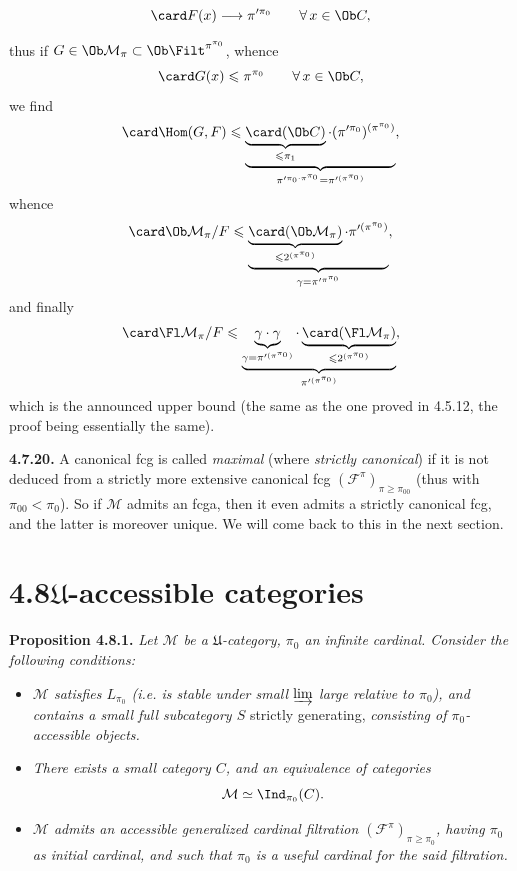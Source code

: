 

\[ \card F(x) \longrightarrow \pi'^{\pi_0} \qquad \forall\, x \in \Ob C , \] %

thus if $G \in \Ob \mathcal{M}_\pi \subset \Ob \Filt^{\pi^{\pi_0}}$, whence
\[ \card G(x) \leqslant \pi^{\pi_0} \qquad \forall\, x \in \Ob C , \]
we find
\[ \card \Hom(G,F) \leqslant \underbrace{\underbrace{\card(\Ob C)}_{\leqslant \pi_1}\cdot(\pi'^{\pi_0})^{(\pi^{\pi_0})}}_{\pi'^{\pi_0\cdot\pi^{\pi_0}} = \pi'^{(\pi^{\pi_0})}} , \]
whence
\[ \card \Ob \mathcal{M}_\pi/F \leqslant \underbrace{\underbrace{\card(\Ob \mathcal{M}_\pi)}_{\leqslant 2^{(\pi^{\pi_0})}}\cdot\pi'^{(\pi^{\pi_0})}}_{\gamma = \pi'^{\pi^{\pi_0}}} , \]
and finally
\[ \card \Fl \mathcal{M}_\pi/F \leqslant \underbrace{\underbrace{\gamma\cdot\gamma}_{\gamma = \pi'^{(\pi^{\pi_0})}}\cdot\underbrace{\card(\Fl \mathcal{M}_\pi)}_{\leqslant 2^{(\pi^{\pi_0})}}}_{\pi'^{(\pi^{\pi_0})}} , \]
which is the announced upper bound (the same as the one proved in 4.5.12, the proof being essentially the same).


\textbf{4.7.20.} A canonical fcg is called \textit{maximal} (where \textit{strictly canonical}) if it is not deduced from a strictly more extensive canonical fcg $(\mathcal{F}^\pi)_{\pi\geqslant\pi_{00}}$ (thus with $\pi_{00} < \pi_0$). So if $\mathcal{M}$ admits an fcga, then it even admits a strictly canonical fcg, and the latter is moreover unique. We will come back to this in the next section. %

\section*{4.8\quad $\mathfrak{U}$-accessible categories}

\textbf{Proposition 4.8.1.} \textit{Let $\mathcal{M}$ be a $\mathfrak{U}$-category, $\pi_0$ an infinite cardinal. Consider the following conditions:}
\begin{itemize}[label={}]
\item[\textit{a)}] \textit{$\mathcal{M}$ satisfies $L_{\pi_0}$ (i.e. is stable under small $\varinjlim$ large relative to $\pi_0$), and contains a small full subcategory $S$} strictly generating, \textit{consisting of $\pi_0$-accessible objects.}
\item[\textit{b)}] \textit{There exists a small category $C$, and an equivalence of categories}
\[ \mathcal{M} \simeq \Ind_{\pi_0}(C) . \]
\item[\textit{c)}] \textit{$\mathcal{M}$ admits an accessible generalized cardinal filtration $(\mathcal{F}^\pi)_{\pi\geqslant\pi_0}$, having $\pi_0$ as initial cardinal, and such that $\pi_0$ is a useful cardinal for the said filtration.}
\end{itemize}

